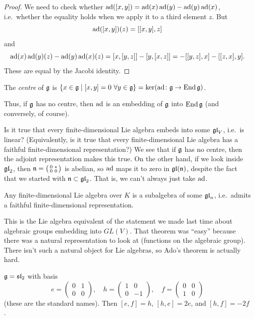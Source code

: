\begin{proof}
We need to check whether $\operatorname{ad}([x, y]) = \operatorname{ad}(x)\operatorname{ad}(y) - \operatorname{ad}(y)\operatorname{ad}(x)$, i.e.\
whether the equality holds when we apply it to a third element $z$. But
\[
  \operatorname{ad}([x, y])(z) = [[x, y], z]
\]
and
\[
  \operatorname{ad}(x)\operatorname{ad}(y)(z) - \operatorname{ad}(y)\operatorname{ad}(x)(z) = [x, [y, z]] - [y, [x, z]]
    = -[[y, z], x] - [[z, x], y].
\]
These are equal by the Jacobi identity.
\end{proof}

\begin{definition}
The \emph{centre} of $\mathfrak{g}$ is
$\{x \in \mathfrak{g} \mid [x, y] = 0 \ \forall y \in \mathfrak{g}\} = \ker(\operatorname{ad}\colon \mathfrak{g} \to \operatorname{End} \mathfrak{g})$.
\end{definition}

Thus, if $\mathfrak{g}$ has no centre, then $\operatorname{ad}$ is an embedding of $\mathfrak{g}$ into
$\operatorname{End} \mathfrak{g}$ (and conversely, of course).

Is it true that every finite-dimensional Lie algebra embeds into some $\mathfrak{gl}_V$,
i.e.\ is linear? (Equivalently, is it true that every finite-dimensional Lie
algebra has a faithful finite-dimensional representation?) We see that if $\mathfrak{g}$
has no centre, then the adjoint representation makes this true. On the other
hand, if we look inside $\mathfrak{gl}_2$, then
$\mathfrak{n} = \bigl(\begin{smallmatrix} 0 & * \\ 0 & 0 \end{smallmatrix}\bigr)$ is
abelian, so $\operatorname{ad}$ maps it to zero in $\mathfrak{gl}(\mathfrak{n})$, despite the fact that we
started with $\mathfrak{n} \subset \mathfrak{gl}_2$. That is, we can't always just take $\operatorname{ad}$.

\begin{theorem}
Any finite-dimensional Lie algebra over $K$ is a subalgebra of some $\mathfrak{gl}_n$,
i.e.\ admits a faithful finite-dimensional representation.
\end{theorem}

\begin{remark}
This is the Lie algebra equivalent of the statement we made last time about
algebraic groups embedding into $GL(V)$. That theorem was ``easy'' because
there was a natural representation to look at (functions on the algebraic
group). There isn't such a natural object for Lie algebras, so Ado's theorem
is actually hard.
\end{remark}

\begin{example}
$\mathfrak{g} = \mathfrak{sl}_2$ with basis
\[
  e = \begin{pmatrix} 0 & 1 \\ 0 & 0 \end{pmatrix}, \quad
  h = \begin{pmatrix} 1 & 0 \\ 0 & -1 \end{pmatrix}, \quad
  f = \begin{pmatrix} 0 & 0 \\ 1 & 0 \end{pmatrix}
\]
(these are the standard names). Then $[e, f] = h$, $[h, e] = 2e$, and
$[h, f] = -2f$.
\end{example}

